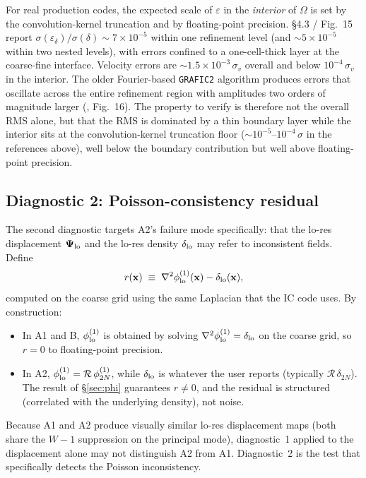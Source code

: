 \documentclass[12pt]{article}
\newcommand{\R}{\mathcal{R}}
\begin{document}
For real production codes, the expected scale of $\varepsilon$ in the
\emph{interior} of $\Omega$ is set by the convolution-kernel truncation
and by floating-point precision. \citet{Hahn2011} \S 4.3 / Fig.~15
report $\sigma(\varepsilon_\delta)/\sigma(\delta) \sim 7\times 10^{-5}$
within one refinement level (and $\sim 5\times 10^{-5}$ within two
nested levels), with errors confined to a one-cell-thick layer at the
coarse-fine interface. Velocity errors are
$\sim 1.5\times 10^{-3}\,\sigma_v$ overall and below
$10^{-4}\,\sigma_v$ in the interior. The older Fourier-based
\texttt{GRAFIC2} algorithm produces errors that oscillate across the
entire refinement region with amplitudes two orders of magnitude
larger (\citealt{Hahn2011}, Fig.~16). The property to verify is
therefore not the overall RMS alone, but that the RMS is dominated by
a thin boundary layer while the interior sits at the convolution-kernel
truncation floor ($\sim 10^{-5}$--$10^{-4}\,\sigma$ in the references
above), well below the boundary contribution but well above
floating-point precision.

\subsection{Diagnostic 2: Poisson-consistency residual}\label{sec:val-poisson}

The second diagnostic targets A2's failure mode specifically: that
the lo-res displacement $\boldsymbol\Psi_{\rm lo}$ and the lo-res
density $\delta_{\rm lo}$ may refer to inconsistent fields. Define
\begin{equation}\label{eq:poisson-resid}
  r(\mathbf x) \;\equiv\; \nabla^2\phi^{(1)}_{\rm lo}(\mathbf x)
                          - \delta_{\rm lo}(\mathbf x),
\end{equation}
computed on the coarse grid using the same Laplacian that the IC
code uses. By construction:
\begin{itemize}
\item In A1 and B, $\phi^{(1)}_{\rm lo}$ is obtained by solving
      $\nabla^2\phi^{(1)}_{\rm lo}=\delta_{\rm lo}$ on the coarse
      grid, so $r=0$ to floating-point precision.
\item In A2, $\phi^{(1)}_{\rm lo} = \R\,\phi^{(1)}_{2N}$, while
      $\delta_{\rm lo}$ is whatever the user reports (typically
      $\R\,\delta_{2N}$). The result of \S\ref{sec:phi} guarantees
      $r\ne 0$, and the residual is structured (correlated with the
      underlying density), not noise.
\end{itemize}
Because A1 and A2 produce visually similar lo-res displacement maps
(both share the $W{-}1$ suppression on the principal mode), diagnostic~1
applied to the displacement alone may not distinguish A2 from A1.
Diagnostic~2 is the test that specifically detects the Poisson
inconsistency.
\end{document}
